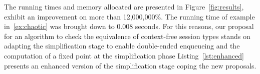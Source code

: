 The running times and memory allocated are presented in
Figure~\ref{fig:results}, exhibit an improvement on more than
12,000,000\%. The running time of example in~\eqref{ex:chaotic} was
brought down to 0.008 seconds. For this reasons, our
proposal for an algorithm to check the equivalence of context-free
session types stands on adapting the simplification stage to enable
double-ended enqueueing and the computation of a fixed point at the
simplification phase Listing~\ref{lst:enhanced} presents an enhanced
version of the simplification stage coping the new proposals.



